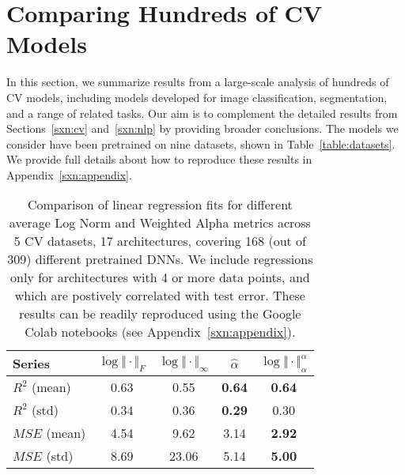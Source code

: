 \section{Comparing Hundreds of CV Models}
\label{sxn:all_cv_models}

In this section, we summarize results from a large-scale analysis of hundreds of CV models, including models developed for image 
classification, segmentation, and a range of related tasks.  
Our aim is to complement the detailed results from Sections~\ref{sxn:cv} and~\ref{sxn:nlp} by providing broader conclusions. %
The models we consider have been pretrained on nine datasets, shown in Table~\ref{table:datasets}.
We provide full details about how to reproduce these results in Appendix~\ref{sxn:appendix}.

\begin{table}[t]
\small
\begin{center}
\begin{tabular}{|p{0.75in}|c|c|c|c|}
\hline
Series        & $\log\Vert\cdot\Vert_{F}$ & $\log\Vert\cdot\Vert_{\infty}$ & $\hat{\alpha}$ & $\log\Vert\cdot\Vert^{\alpha}_{\alpha}$ \\
\hline
$R^{2}$ (mean) & 0.63 &  0.55 & \textbf{0.64} & \textbf{0.64} \\
$R^{2}$ (std)  & 0.34 &  0.36 & \textbf{0.29} &          0.30 \\
\hline
$MSE$ (mean)   & 4.54 &  9.62 &          3.14 & \textbf{2.92} \\
$MSE$ (std)    & 8.69 & 23.06 &          5.14 & \textbf{5.00} \\
\hline
\end{tabular}
\end{center}
\caption{Comparison of linear regression fits for different average Log Norm and Weighted Alpha metrics across 5 CV datasets, 17 architectures, covering 168 (out of 309) different pretrained DNNs.  
         We include regressions only for architectures with 4 or more data points, and which are postively correlated with test error.
         These results can be readily reproduced using the Google Colab notebooks (see Appendix~\ref{sxn:appendix}). 
        }
\label{table:results}
\end{table}


